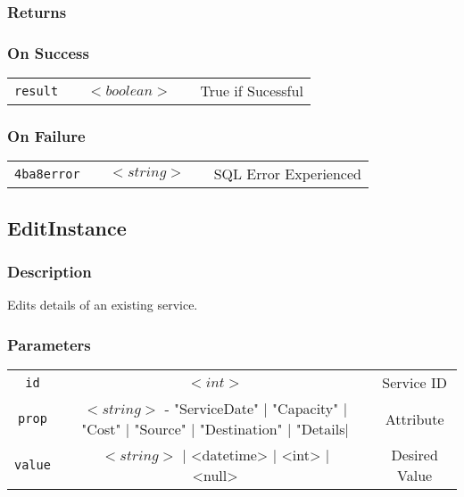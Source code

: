 \documentclass[a4paper,12pt]{article}
\begin{document}
\subsubsection{Returns}

\subsubsection{On Success}

\begin{tabular}{ccccc}
\verb!result! & \vspace{15mm} & $<boolean>$ & \vspace{15mm} & True if Sucessful \\
\end{tabular}

\subsubsection{On Failure}

\begin{tabular}{ccccc}
\verb!4ba8error! & \vspace{15mm} & $<string>$ & \vspace{15mm} & SQL Error Experienced \\
\end{tabular}


\subsection{EditInstance}

\subsubsection{Description}

Edits details of an existing service.

\subsubsection{Parameters}

\begin{tabular}{ccccc}
\verb!id! & \vspace{15mm} & $<int>$ & \vspace{15mm} & Service ID \\
\verb!prop! & \vspace{15mm} & $<string>$ - "ServiceDate" | "Capacity" | "Cost" | "Source" | "Destination" | "Details|& \vspace{15mm} & Attribute  \\
\verb!value! & \vspace{15mm} & $<string>$ | <datetime> | <int> | <null> & \vspace{15mm} & Desired Value \\
\end{tabular}
\end{document}
